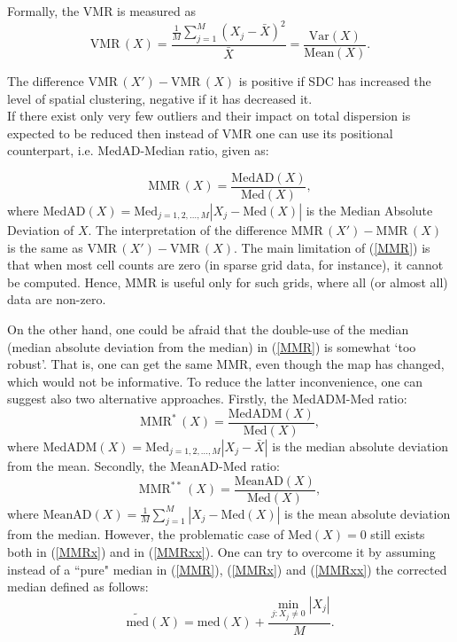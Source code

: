 Formally, the VMR is measured as
\begin{equation}
    \mathrm{VMR}\,(X) = \frac{\frac{1}{M}\sum_{j = 1}^M (X_j - \bar{X})^2}{\bar{X}} = \frac{\mathrm{Var}(X)}{\mathrm{Mean}(X)}.
\end{equation}

The difference $\mathrm{VMR}\,(X') - \mathrm{VMR}\,(X)$ is positive if SDC has increased the level of spatial clustering, negative if it has decreased it.\\

If there exist only very few outliers and their impact on total dispersion is expected to be reduced then instead of $\mathrm{VMR}$ one can use its positional counterpart, i.e. MedAD-Median ratio, given as:

\begin{equation}
    \mathrm{MMR}\,(X) = \frac{\mathrm{MedAD}(X)}{\mathrm{Med}(X)},
\label{MMR}
\end{equation}
where $\mathrm{MedAD}(X)=\mathrm{Med}_{j=1,2,\ldots,M}|X_j-\mathrm{Med}(X)|$ is the Median Absolute Deviation of $X$. The interpretation of the difference $\mathrm{MMR}\,(X') - \mathrm{MMR}\,(X)$ is the same as $\mathrm{VMR}\,(X') - \mathrm{VMR}\,(X)$. The main limitation of (\ref{MMR}) is that when most cell counts are zero (in sparse grid data, for instance), it cannot be computed. Hence, MMR is useful only for such grids, where all (or almost all) data are non-zero.

On the other hand, one could be afraid that the double-use of the median (median absolute deviation from the median) in (\ref{MMR}) is somewhat `too robust'. That is, one can get the same MMR, even though the map has changed, which would not be informative.
To reduce the latter inconvenience, one can suggest also two alternative approaches. Firstly, the MedADM-Med ratio:
\begin{equation}
    \mathrm{MMR^*}\,(X) = \frac{\mathrm{MedADM}(X)}{\mathrm{Med}(X)},
\label{MMRx}
\end{equation}
where $\mathrm{MedADM}(X)=\mathrm{Med}_{j=1,2,\ldots,M}|X_j-\bar{X}|$ is the median absolute deviation from the mean. Secondly, the MeanAD-Med ratio:
\begin{equation}
    \mathrm{MMR^{**}}\,(X) = \frac{\mathrm{MeanAD}(X)}{\mathrm{Med}(X)},
\label{MMRxx}
\end{equation}
where $\mathrm{MeanAD}(X)= \frac{1}{M} \sum_{j=1}^M |X_j-\mathrm{Med}(X)|$ is the mean absolute deviation from the median.
However, the problematic case of $\mathrm{Med}(X) = 0$ still exists both in (\ref{MMRx}) and in (\ref{MMRxx}). One can try to overcome it by assuming instead of a ``pure" median in (\ref{MMR}), (\ref{MMRx}) and (\ref{MMRxx}) the corrected median defined as follows:
\begin{equation}
\mathrm{\widetilde{med}}(X)=\mathrm{med}(X)+\frac{\mathop{\min}\limits_{j:X_{j}\ne 0}{|X_{j}|}}{M}.
\label{MEDc}
\end{equation}

